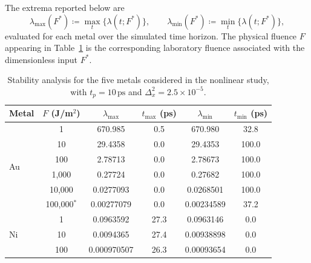 The extrema reported below are
\begin{equation}
    \lambda_{\max}(F^*) \coloneqq \max_t \{\lambda(t;F^*)\},
    \qquad
    \lambda_{\min}(F^*) \coloneqq \min_t \{\lambda(t;F^*)\},
    \label{eq:ch2-stiffness-extrema}
\end{equation}
evaluated for each metal over the simulated time horizon. The physical fluence \(F\) appearing in Table~\ref{tab:ch2-stiffness} is the corresponding laboratory fluence associated with the dimensionless input \(F^*\).

\begin{table}[htbp]
    \centering
    \caption{Stability analysis for the five metals considered in the nonlinear study, with \(t_p = 10\,\mathrm{ps}\) and \(\Delta_x^2 = 2.5 \times 10^{-5}\).}
    \label{tab:ch2-stiffness}
    \small
    \begin{tabular}{@{}lccccc@{}}
        \toprule
        Metal & \(F\) (J/m\(^2\)) & \(\lambda_{\max}\)    & \(t_{\max}\) (ps) & \(\lambda_{\min}\)     & \(t_{\min}\) (ps) \\
        \midrule
        \multirow{6}{*}{Au}
              & 1                 & 670.985               & 0.5               & 670.980                & 32.8              \\
              & 10                & 29.4358               & 0.0               & 29.4353                & 100.0             \\
              & 100               & 2.78713               & 0.0               & 2.78673                & 100.0             \\
              & 1,000             & 0.27724               & 0.0               & 0.27682                & 100.0             \\
              & 10,000            & 0.0277093             & 0.0               & 0.0268501              & 100.0             \\
              & 100,000\(^{*}\)   & 0.00277079            & 0.0               & 0.00234589             & 37.2              \\
        \midrule
        \multirow{6}{*}{Ni}
              & 1                 & 0.0963592             & 27.3              & 0.0963146              & 0.0               \\
              & 10                & 0.0094365             & 27.4              & 0.00938898             & 0.0               \\
              & 100               & 0.000970507           & 26.3              & 0.00093654             & 0.0               \\

\end{tabular}
\end{table}
